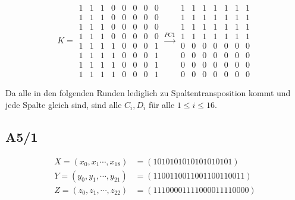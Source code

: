 \begin{equation}
K=\begin{matrix}
1 & 1 & 1 & 0 & 0 & 0 & 0 & 0 \\
1 & 1 & 1 & 0 & 0 & 0 & 0 & 0 \\
1 & 1 & 1 & 0 & 0 & 0 & 0 & 0 \\
1 & 1 & 1 & 0 & 0 & 0 & 0 & 0 \\
1 & 1 & 1 & 1 & 0 & 0 & 0 & 1 \\
1 & 1 & 1 & 1 & 0 & 0 & 0 & 1 \\
1 & 1 & 1 & 1 & 0 & 0 & 0 & 1 \\
1 & 1 & 1 & 1 & 0 & 0 & 0 & 1 
\end{matrix} \xrightarrow{PC1}
\begin{matrix}
1 & 1 & 1 & 1 & 1 & 1 & 1 \\
1 & 1 & 1 & 1 & 1 & 1 & 1 \\
1 & 1 & 1 & 1 & 1 & 1 & 1 \\ 
1 & 1 & 1 & 1 & 1 & 1 & 1 \\ 
0 & 0 & 0 & 0 & 0 & 0 & 0 \\ 
0 & 0 & 0 & 0 & 0 & 0 & 0 \\ 
0 & 0 & 0 & 0 & 0 & 0 & 0 \\ 
0 & 0 & 0 & 0 & 0 & 0 & 0 
\end{matrix}
\end{equation}

Da alle in den folgenden Runden lediglich zu Spaltentransposition kommt und jede Spalte gleich sind, 
sind alle $C_i,D_i$ für alle $1 \le i \le 16$.


\subsection{A5/1}

\begin{align}
X = (x_0, x_1 \cdots , x_{18}) &= (1010101010101010101)    \\
Y = (y_0, y_1, \cdots , y_{21}) &= (1100110011001100110011) \\
Z = (z_0, z_1, \cdots , z_{22}) &= (11100001111000011110000)
\end{align}

\begin{algorithm}[H]
\end{algorithm}

